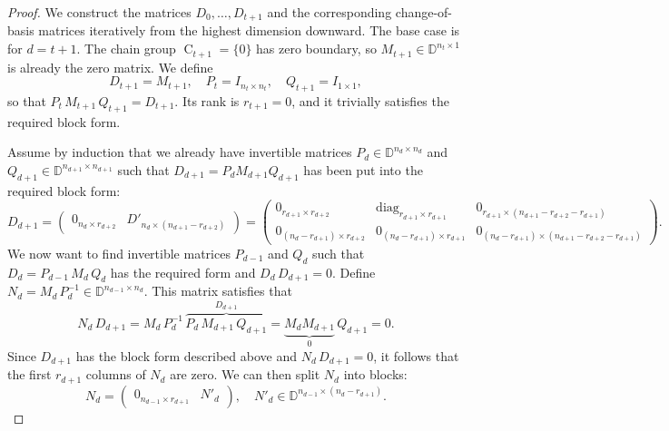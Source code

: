 \documentclass[a4paper,10pt]{article}
\newcommand{\bbd}{\mathbb{D}}
\DeclareMathOperator{\Co}{C}
\begin{document}
\begin{proof}
We construct the matrices \(D_0,\dots,D_{t+1}\) and the corresponding change-of-basis matrices iteratively from the highest dimension downward.  
The base case is for \(d=t+1\). The chain group \(\Co_{t+1} = \{0\}\) has zero boundary, so \(M_{t+1} \in \bbd^{n_t \times 1}\) is already the zero matrix. We define
\[
D_{t+1} = M_{t+1}, \quad P_t = I_{n_t \times n_t}, \quad Q_{t+1} = I_{1 \times 1},
\] 
so that \(P_t \, M_{t+1} \, Q_{t+1} = D_{t+1}\). Its rank is \(r_{t+1} = 0\), and it trivially satisfies the required block form.

Assume by induction that we already have invertible matrices \(P_d \in \bbd^{n_d \times n_d}\) and \(Q_{d+1} \in \bbd^{n_{d+1}\times n_{d+1}}\) such that \(D_{d+1}=P_d M_{d+1}Q_{d+1}\) has been put into the required block form:
\[
D_{d+1} = 
\begin{pmatrix} 0_{n_{d}\times r_{d+2}} & D'_{n_{d} \times (n_{d+1} - r_{d+2})} \end{pmatrix} =
\begin{pmatrix}
0_{r_{d+1} \times r_{d+2}} & \text{diag}_{r_{d+1}\times r_{d+1}} & 0_{r_{d+1} \times (n_{d+1}-r_{d+2}-r_{d+1})} \\
0_{(n_{d}-r_{d+1}) \times r_{d+2}} & 0_{(n_{d}-r_{d+1}) \times r_{d+1}} & 0_{(n_{d}-r_{d+1})\times (n_{d+1}-r_{d+2}-r_{d+1})}
\end{pmatrix}.
\]
We now want to find invertible matrices \(P_{d-1}\) and \(Q_d\) such that \(D_{d} = P_{d-1}\, M_d \, Q_d\) has the required form and \(D_d\, D_{d+1}=0\).  Define \(N_d = M_d \, P_d^{-1} \in \bbd^{n_{d-1} \times n_d}\).
This matrix satisfies that
\[
N_d \, D_{d+1} =
M_d \, P_d^{-1} \, \overbrace{P_d \, M_{d+1} \, Q_{d+1}}^{D_{d+1}} = 
\underbrace{M_d M_{d+1}}_{0} \, Q_{d+1} = 0.
\] 
Since \(D_{d+1}\) has the block form described above and \(N_d \, D_{d+1} = 0\), it follows that the first \(r_{d+1}\) columns of \(N_d\) are zero. We can then split \(N_d\) into blocks:
\[
N_d = \begin{pmatrix} 0_{n_{d-1}\times r_{d+1}} & N'_d \end{pmatrix}, \quad N'_d \in \bbd^{n_{d-1} \times (n_d - r_{d+1})}.
\]


\end{proof}
\end{document}
